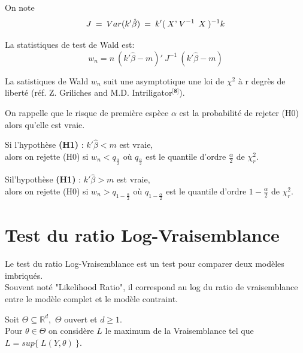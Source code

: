 \documentclass[11pt,fleqn]{book} %
\begin{document}
	\vspace{1em}
	
	On note 
	\[
	J\:=\:Var(k'\hat{\beta})\:=\:k' (\:X\textnormal{'} \:V^{-1}\:\: X\:)^{-1} k
	\]
	
	\vspace{1em}
	
	La statistiques de test de Wald est: 
	\[
	w_n=n\:(k'\hat{\beta}-m)'\:J^{-1}\:(k'\hat{\beta}-m) 
	\]
	\vspace{1em}
	
	La satistiques de Wald $w_n$ suit une asymptotique une loi de $\chi^2$ à r degrès de liberté (réf.  Z. Griliches and M.D. Intriligator$^{\textbf{[8]}}$). 
	
	\vspace{1em}
	
	On rappelle que le risque de première espèce $\alpha$ est la probabilité de rejeter (H0) alors qu'elle est vraie. 
	
	\vspace{1em}
	
	Si l'hypothèse \textbf{(H1)} :  \: $k'\hat{\beta} < m$ est vraie,\\
	alors on rejette (H0) si \: $w_n < q_{\frac{\alpha}{2}}$ \:où\: $q_{\frac{\alpha}{2}}$ est le quantile d'ordre $\frac{\alpha}{2}$ de $\chi_r^2$.
	
	\vspace{1em}
	
	Sil'hypothèse \textbf{(H1)} :  \: $k'\hat{\beta} > m$ est vraie,\\
	alors on rejette (H0) si \: $w_n > q_{1-\frac{\alpha}{2}}$ \:où\: $q_{1-\frac{\alpha}{2}}$ est le quantile d'ordre $1-\frac{\alpha}{2}$ de $\chi_r^2$.
	
	
	\newpage
	
	\section{Test du ratio Log-Vraisemblance}
	
	\vspace{1em}
	
	Le test du ratio Log-Vraisemblance est un test pour comparer deux modèles imbriqués.\\ 
	Souvent noté "Likelihood Ratio", il correspond au log du ratio de vraisemblance entre le modèle complet et le modèle contraint.
	
	\vspace{1em}
	
	Soit $\Theta\subseteq \mathbb{R}^d,$ $\Theta$ ouvert et $d\geq 1$.\\ Pour $\theta\in\Theta$ on considère $L$ le maximum de la Vraisemblance tel que $L=sup\{\:L(Y,\theta)\:\}$. 
	
\end{document}
